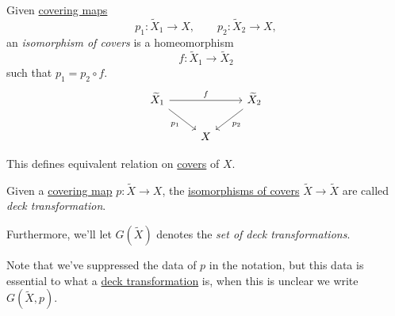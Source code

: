 \begin{definition}\label{def:isomorphism-of-covers}
	Given \hyperref[def:covering-map]{covering maps}
	\[
		p_1\colon \widetilde{X} _1\to X,\qquad p_2\colon \widetilde{X} _2\to X,
	\]
	an \emph{isomorphism of covers} is a homeomorphism
	\[
		f\colon \widetilde{X} _1\to \widetilde{X} _2
	\]
	such that \(p_1 = p_2\circ f\).
	\[
		\begin{tikzcd}
			{\widetilde{X}_1} && {\widetilde{X}_2} \\
			& X
			\arrow["{p_1}"', from=1-1, to=2-2]
			\arrow["{p_2}", from=1-3, to=2-2]
			\arrow["f", from=1-1, to=1-3]
		\end{tikzcd}
	\]
\end{definition}

\begin{exercise}
	This defines equivalent relation on \hyperref[def:isomorphism-of-covers]{covers} of \(X\).
\end{exercise}

\begin{definition}\label{def:deck-transformation}
	Given a \hyperref[def:covering-map]{covering map} \(p\colon \widetilde{X} \to X\), the  \hyperref[def:isomorphism-of-covers]{isomorphisms of covers}
	\(\widetilde{X} \to \widetilde{X} \) are called \emph{deck transformation}.

	\par Furthermore, we'll let \(G(\widetilde{X} )\) denotes the \emph{set of deck transformations}.
\end{definition}
\begin{note}
	Note that we've suppressed the data of \(p\) in the notation, but this data is essential to what a \hyperref[def:deck-transformation]{deck transformation}
	is, when this is unclear we write \(G(\widetilde{X} , p)\).
\end{note}